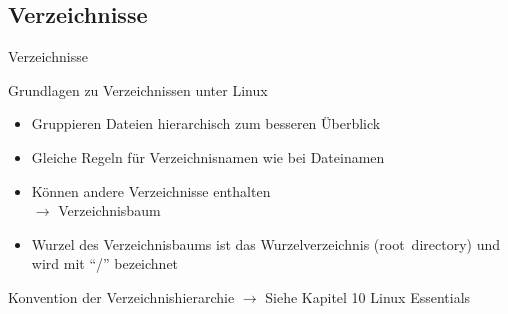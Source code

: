 \documentclass[aspectratio=43]{beamer}
\begin{document}
\subsection{Verzeichnisse}
\begin{frame}{Verzeichnisse}
  \begin{block}{Grundlagen zu Verzeichnissen unter Linux}
  \begin{itemize}
    \item Gruppieren Dateien hierarchisch zum besseren Überblick
    \item Gleiche Regeln für Verzeichnisnamen wie bei Dateinamen
    \item Können andere Verzeichnisse enthalten \\
      $\rightarrow$ Verzeichnisbaum
    \item Wurzel des Verzeichnisbaums ist das Wurzelverzeichnis (root~directory)
          und wird mit "`/"' bezeichnet
  \end{itemize}
  \end{block}
  \begin{block}{Konvention der Verzeichnishierarchie}
    $\rightarrow$ Siehe Kapitel 10 Linux Essentials
  \end{block}

\end{frame}
\end{document}
